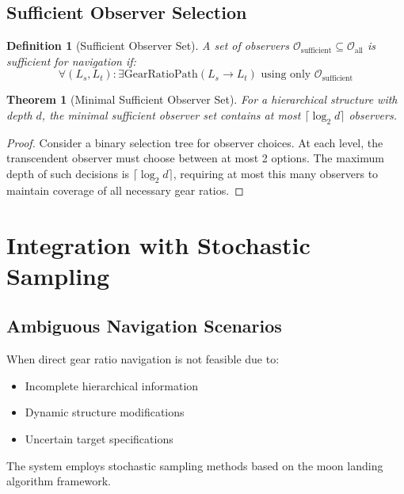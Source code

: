 \documentclass[12pt,a4paper]{article}
\newtheorem{theorem}{Theorem}
\newtheorem{definition}{Definition}
\begin{document}
\subsection{Sufficient Observer Selection}

\begin{definition}[Sufficient Observer Set]
A set of observers $\mathcal{O}_{\text{sufficient}} \subseteq \mathcal{O}_{\text{all}}$ is sufficient for navigation if:
\begin{equation}
\forall (L_s, L_t): \exists \text{GearRatioPath}(L_s \to L_t) \text{ using only } \mathcal{O}_{\text{sufficient}}
\end{equation}
\end{definition}

\begin{theorem}[Minimal Sufficient Observer Set]
For a hierarchical structure with depth $d$, the minimal sufficient observer set contains at most $\lceil \log_2 d \rceil$ observers.
\end{theorem}

\begin{proof}
Consider a binary selection tree for observer choices. At each level, the transcendent observer must choose between at most 2 options. The maximum depth of such decisions is $\lceil \log_2 d \rceil$, requiring at most this many observers to maintain coverage of all necessary gear ratios.
\end{proof}

\section{Integration with Stochastic Sampling}

\subsection{Ambiguous Navigation Scenarios}

When direct gear ratio navigation is not feasible due to:
\begin{itemize}
\item Incomplete hierarchical information
\item Dynamic structure modifications
\item Uncertain target specifications
\end{itemize}

The system employs stochastic sampling methods based on the moon landing algorithm framework.
\end{document}
